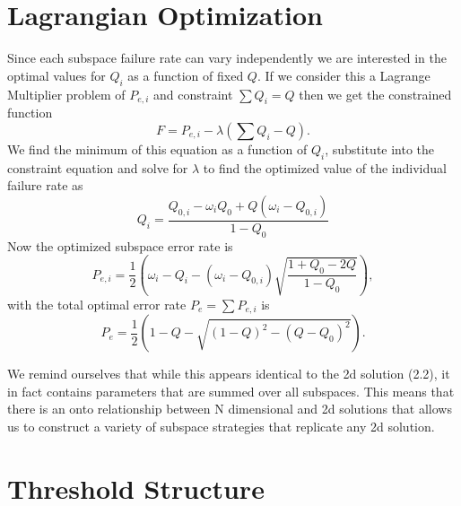 \documentclass[12pt,oneside,english,reqno]{amsbook}
\numberwithin{section}{chapter}
\numberwithin{equation}{section}
\numberwithin{figure}{section}
\begin{document}
\section{Lagrangian Optimization}

Since each subspace failure rate can vary independently we are interested in the optimal values for $Q_i$ as a function of fixed $Q$.
If we consider this a Lagrange Multiplier problem of $P_{e,i}$ and constraint $\sum Q_i = Q$ then we get the constrained function
\begin{equation}F = P_{e,i} - \lambda (\sum Q_i - Q).\end{equation}
We find the minimum of this equation as a function of $Q_i$, substitute into the constraint equation and solve for $\lambda$ to find the optimized value of the individual failure rate as
\begin{equation} Q_i = \frac{Q_{0,i} - \omega_i Q_0 + Q(\omega_i - Q_{0,i})}{1- Q_0}\end{equation}
Now the optimized subspace error rate is
 \begin{equation}P_{e,i}= \frac{1}{2}( \omega_i-Q_i - (\omega_i - Q_{0,i})\sqrt{\frac{1+ Q_0 -2 Q}{1-Q_0}}),\end{equation}
with the total optimal error rate $P_e = \sum P_{e,i}$ is
\begin{equation}P_e = \frac{1}{2}(1-Q-\sqrt{(1-Q)^2-(Q-Q_0)^2}).\end{equation}

We remind ourselves that while this appears identical to the 2d solution (2.2), it in fact contains parameters that are summed over all subspaces.  This means that there is an onto relationship between N dimensional and 2d solutions that allows us to construct a variety of subspace strategies that replicate any 2d solution.

\section{Threshold Structure}
\end{document}
